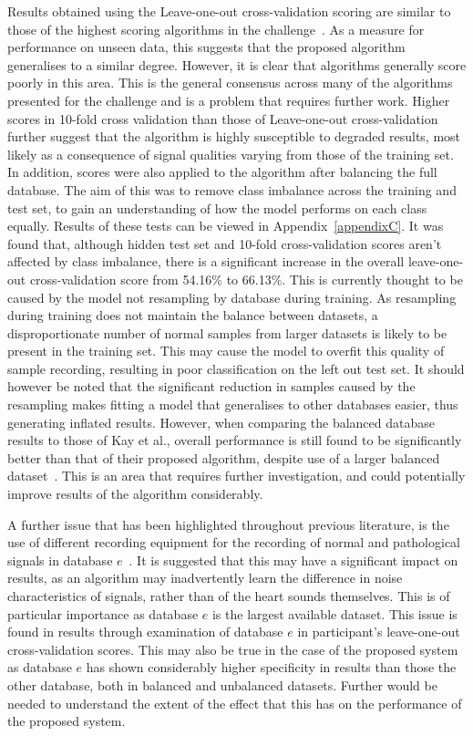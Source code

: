 \documentclass[titlepage, 12pt]{scrartcl} \usepackage{enumitem}
\begin{document}
Results obtained using the Leave-one-out cross-validation scoring are similar
to those of the highest scoring algorithms in the
challenge~\parencite{Homsi2017, Bobillo2016}. As a measure for performance on
unseen data, this suggests that the proposed algorithm generalises to a similar
degree. However, it is clear that algorithms generally score poorly in this
area. This is the general consensus across many of the algorithms presented for
the challenge and is a problem that requires further work. Higher scores in
10-fold cross validation than those of Leave-one-out cross-validation further
suggest that the algorithm is highly susceptible to degraded results, most
likely as a consequence of signal qualities varying from those of the training
set.\\
In addition, scores were also applied to the algorithm after balancing the full
database. The aim of this was to remove class imbalance across the training
and test set, to gain an understanding of how the model performs on each class
equally. Results of these tests can be viewed in Appendix~\ref{appendixC}. It
was found that, although hidden test set and 10-fold cross-validation scores
aren't affected by class imbalance, there is a significant increase in the overall
leave-one-out cross-validation score from 54.16\% to 66.13\%. This is currently
thought to be caused by the model not resampling by database during training.
As resampling during training does not maintain the balance between datasets, a
disproportionate number of normal samples from larger datasets is likely to be
present in the training set. This may cause the model to overfit this quality
of sample recording, resulting in poor classification on the left out test set.
It should however be noted that the significant reduction in samples caused by
the resampling makes fitting a model that generalises to other databases easier,
thus generating inflated results. However, when comparing the balanced database
results to those of Kay et al., overall performance is still found to be
significantly better than that of their proposed algorithm, despite use of a
larger balanced dataset~\parencite{Kay2017}. This is an area that requires
further investigation, and could potentially improve results of the algorithm
considerably.

A further issue that has been highlighted throughout previous literature, is
the use of different recording equipment for the recording of normal and
pathological signals in database $e$~\parencite{Kay2017, Bobillo2016}. It is
suggested that this may have a significant impact on results, as an algorithm
may inadvertently learn the difference in noise characteristics of signals,
rather than of the heart sounds themselves. This is of particular importance as
database $e$ is the largest available dataset. This issue is found in results
through examination of database $e$ in participant's leave-one-out
cross-validation scores. This may also be true in the case of the proposed
system as database $e$ has shown considerably higher specificity in results
than those the other database, both in balanced and unbalanced datasets.
Further would be needed to understand the extent of the effect that this has on
the performance of the proposed system.\\
\end{document}
